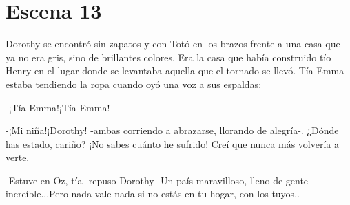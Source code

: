 \chapter{Escena 13}
Dorothy se encontró sin zapatos y con Totó en los brazos frente a una casa que ya no era gris, sino de brillantes colores. Era la casa que había construido tío Henry en el lugar donde se levantaba aquella que el tornado se llevó. Tía Emma estaba tendiendo la ropa cuando oyó una voz a sus espaldas:

-¡Tía Emma!¡Tía Emma!

-¡Mi niña!¡Dorothy! -ambas corriendo a abrazarse, llorando de alegría-. ¿Dónde has estado, cariño? ¡No sabes cuánto he sufrido! Creí que nunca más volvería a verte.

-Estuve en Oz, tía -repuso Dorothy- Un país maravilloso, lleno de gente increíble...Pero nada vale nada si no estás en tu hogar, con los tuyos..

